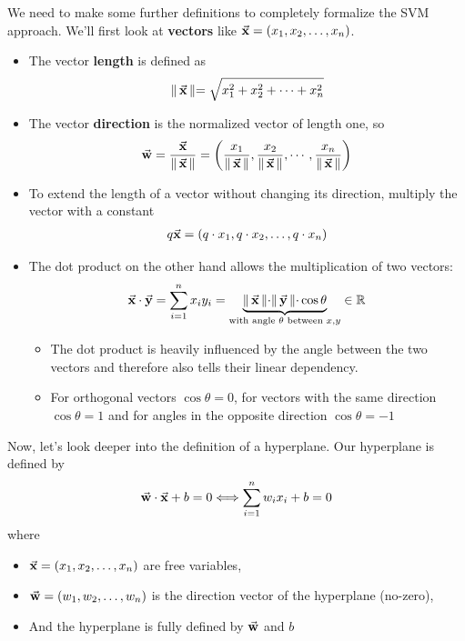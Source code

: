 We need to make some further definitions to completely formalize the SVM approach. We'll first look at \textbf{vectors} like $\vec{\mathbf{x}} = (x_1, x_2, \dots, x_n)$.
\begin{itemize}
  \item The vector \textbf{length} is defined as 
  \begin{align*}\lVert\, \vec{\mathbf{x}} \,\lVert = \sqrt{x_1^2 + x_2^2 + \cdots + x_n^2}\end{align*}
  \item The vector \textbf{direction} is the normalized vector of length one, so 
  \begin{align*}\vec{\mathbf{w}} = \frac{\vec{\mathbf{x}}}{\lVert\, \vec{\mathbf{x}} \,\lVert} = \left(\frac{x_1}{\lVert\, \vec{\mathbf{x}} \,\lVert}, \frac{x_2}{\lVert\, \vec{\mathbf{x}} \,\lVert}, \cdots, \frac{x_n}{\lVert\, \vec{\mathbf{x}} \,\lVert}\right)\end{align*}
  \item To extend the length of a vector without changing its direction, multiply the vector with a constant
  \begin{align*}q\vec{\mathbf{x}} = (q\cdot x_1, q\cdot x_2, \dots, q\cdot x_n)\end{align*}
  \item The dot product on the other hand allows the multiplication of two vectors: 
  \begin{align*}\vec{\mathbf{x}}\cdot\vec{\mathbf{y}} = \sum_{i=1}^n x_i y_i = \underbrace{\lVert\, \vec{\mathbf{x}} \,\lVert\cdot\lVert\, \vec{\mathbf{y}} \,\lVert\cdot \cos \theta}_{\textnormal{\color{black}{with angle }}\theta \textnormal{\color{black}{ between }}x,y} \in \mathbb{R}\end{align*}
  \begin{note}
    \begin{itemize}
      \item The dot product is heavily influenced by the angle between the two vectors and therefore also tells their linear dependency.
      \item For orthogonal vectors $\cos \theta = 0$, for vectors with the same direction $\cos \theta = 1$ and for angles in the opposite direction $\cos \theta = -1$
    \end{itemize}
  \end{note}
\end{itemize}

Now, let's look deeper into the definition of a hyperplane. Our hyperplane is defined by
\begin{align*}
  \vec{\mathbf{w}}\cdot\vec{\mathbf{x}} + b = 0 \Longleftrightarrow  \sum_{i=1}^n w_ix_i + b = 0
\end{align*}
where
\begin{itemize}
  \item $\vec{\mathbf{x}} = (x_1, x_2, \dots, x_n)$ are free variables,
  \item $\vec{\mathbf{w}} = (w_1, w_2, \dots, w_n)$ is the direction vector of the hyperplane (no-zero),
  \item And the hyperplane is fully defined by $\vec{\mathbf{w}}$ and $b$
\end{itemize}

